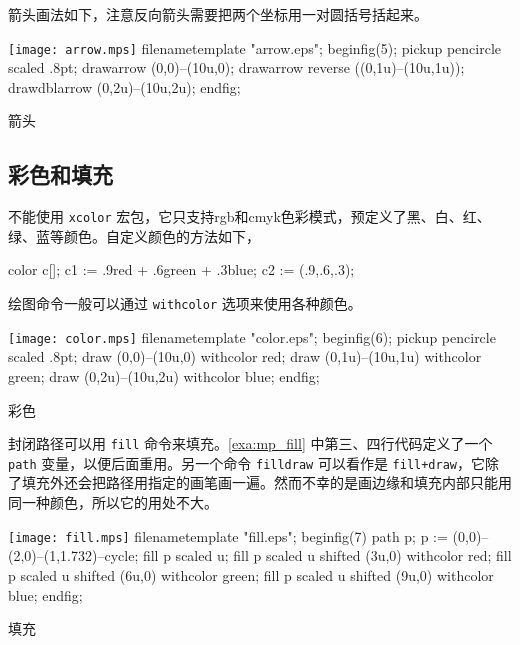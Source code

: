 箭头画法如下，注意反向箭头需要把两个坐标用一对圆括号括起来。

\begin{example}[!h]
\begin{FBTDemo}[numbers=left]{\texttt{[image: arrow.mps]}}
filenametemplate "arrow.eps";
beginfig(5);
pickup pencircle scaled .8pt;
drawarrow (0,0)--(10u,0);
drawarrow reverse ((0,1u)--(10u,1u));
drawdblarrow (0,2u)--(10u,2u);
endfig;
\end{FBTDemo}
\caption{\MP 箭头}
\label{exa:mp_arrow}
\end{example}

\subsection{彩色和填充}

\MP 不能使用 \texttt{xcolor} 宏包，它只支持rgb和cmyk色彩模式，预定义了黑、白、红、绿、蓝等颜色。自定义颜色的方法如下，

\begin{Code}[]
color c[];
c1 := .9red + .6green + .3blue;
c2 := (.9,.6,.3);
\end{Code}

绘图命令一般可以通过 \texttt{withcolor} 选项来使用各种颜色。

\begin{example}[h]
\begin{FBTDemo}[numbers=left]{\texttt{[image: color.mps]}}
filenametemplate "color.eps";
beginfig(6);
pickup pencircle scaled .8pt;
draw (0,0)--(10u,0) withcolor red;
draw (0,1u)--(10u,1u) withcolor green;
draw (0,2u)--(10u,2u) withcolor blue;
endfig;
\end{FBTDemo}
\caption{\MP 彩色}
\label{exa:mp_color}
\end{example}

封闭路径可以用 \texttt{fill} 命令来填充。\autoref{exa:mp_fill} 中第三、四行代码定义了一个 \texttt{path} 变量，以便后面重用。另一个命令 \texttt{filldraw} 可以看作是 \texttt{fill+draw}，它除了填充外还会把路径用指定的画笔画一遍。然而不幸的是画边缘和填充内部只能用同一种颜色，所以它的用处不大。

\begin{example}[h]
\begin{FBTDemo}[numbers=left]{\texttt{[image: fill.mps]}}
filenametemplate "fill.eps";
beginfig(7)
path p;
p := (0,0)--(2,0)--(1,1.732)--cycle;
fill p scaled u;
fill p scaled u shifted (3u,0) withcolor red;
fill p scaled u shifted (6u,0) withcolor green;
fill p scaled u shifted (9u,0) withcolor blue;
endfig;
\end{FBTDemo}
\caption{\MP 填充}
\label{exa:mp_fill}
\end{example}

